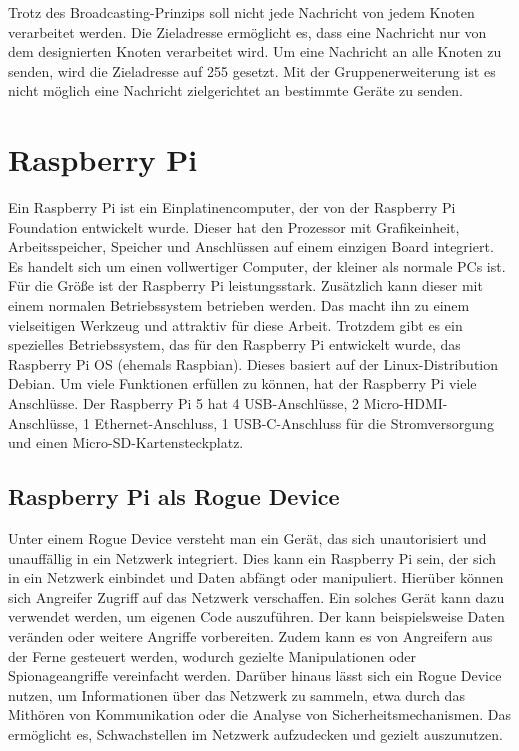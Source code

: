 Trotz des Broadcasting-Prinzips soll nicht jede Nachricht von jedem Knoten verarbeitet werden.
Die Zieladresse ermöglicht es, dass eine Nachricht nur von dem designierten Knoten verarbeitet wird.
Um eine Nachricht an alle Knoten 
zu senden, wird die Zieladresse auf 255 gesetzt. Mit der Gruppenerweiterung ist es nicht möglich eine Nachricht 
zielgerichtet an bestimmte Geräte zu senden. \cite{Murvay2018}




\section{Raspberry Pi}
Ein Raspberry Pi ist ein Einplatinencomputer, der von der Raspberry Pi Foundation entwickelt wurde. 
Dieser hat den Prozessor mit Grafikeinheit, Arbeitsspeicher, Speicher und Anschlüssen auf einem einzigen Board integriert.
Es handelt sich um einen vollwertiger Computer, der kleiner als normale PCs ist. Für die Größe ist der Raspberry Pi
leistungsstark. Zusätzlich kann dieser mit einem normalen Betriebssystem
betrieben werden. Das macht ihn zu einem vielseitigen Werkzeug und attraktiv für diese Arbeit.
Trotzdem gibt es ein spezielles Betriebssystem, das für den Raspberry Pi entwickelt wurde, das Raspberry Pi OS (ehemals Raspbian).
Dieses basiert auf der Linux-Distribution Debian. Um viele Funktionen erfüllen zu können, hat der Raspberry Pi viele Anschlüsse.
Der Raspberry Pi 5 hat 4 USB-Anschlüsse, 2 Micro-HDMI-Anschlüsse, 1 Ethernet-Anschluss, 1 USB-C-Anschluss für die Stromversorgung und einen Micro-SD-Kartensteckplatz.

\subsection{Raspberry Pi als Rogue Device}
Unter einem Rogue Device versteht man ein Gerät, das sich unautorisiert und unauffällig in ein Netzwerk integriert. \cite{Scarfone2008}
Dies kann ein Raspberry Pi sein, der sich in ein Netzwerk einbindet und Daten abfängt oder manipuliert. Hierüber können 
sich Angreifer Zugriff auf das Netzwerk verschaffen. 
Ein solches Gerät kann dazu verwendet werden, um eigenen Code auszuführen. Der kann beispielsweise Daten veränden oder 
weitere Angriffe vorbereiten. Zudem kann es von Angreifern aus der Ferne gesteuert werden, wodurch gezielte 
Manipulationen oder Spionageangriffe vereinfacht werden. Darüber hinaus lässt sich ein Rogue Device nutzen, um Informationen 
über das Netzwerk zu sammeln, etwa durch das Mithören von Kommunikation oder die Analyse von Sicherheitsmechanismen.
Das ermöglicht es, Schwachstellen im Netzwerk aufzudecken und gezielt auszunutzen.

